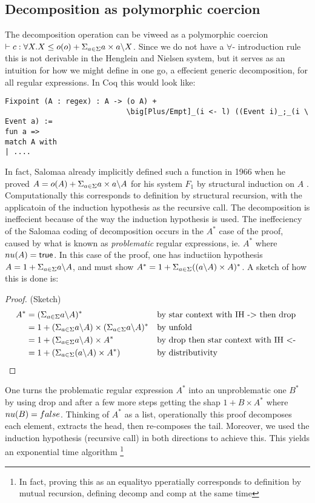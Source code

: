 \documentclass[a4paper,UKenglish,cleveref, autoref, thm-restate]{lipics-v2021}
\newcommand\mycomment[1]{}
\begin{document}
\subsection{Decomposition as polymorphic coercion}
The decomposition operation can be viweed as a polymorphic coercion $\contains{}{c}{\forall X. X}{\myo{o} + \decomp{X}}$. Since we do not have a $\forall$- introduction rule this is not derivable in the Henglein and Nielsen system, but it serves as an intuition for how we might define in one go, a effecient generic decomposition, for all regular expressions. In Coq this would look like:
\begin{verbatim}
Fixpoint (A : regex) : A -> (o A) +  
                            \big[Plus/Empt]_(i <- l) ((Event i)_;_(i \ Event a) :=
fun a => 
match A with 
| ....
\end{verbatim}
In fact, Salomaa already implicitly defined such a function in 1966 when he proved $A = o(A) + \Sigma_{a \in \Sigma} a\times a \backslash A$ for his system $F_1$ by structural induction on $A$ \mycomment{is that the right name of system?}. Computationally this corresponds to definition by structural recursion, with the applicatoin of the induction hypothesis as the recursive call. The decomposition is ineffecient because of the way the  induction hypothesis is used. The ineffeciency of the Salomaa coding of decomposition occurs in the $A^*$ case of the proof, caused by what is known as \textit{problematic} regular expressions, ie. $A^ *$ where $\mynu{A} = \textsf{true}$. In this case of the proof, one has inductiion hypothesis $A = 1 + \Sigma_{a \in \Sigma} a \backslash A$, and must show $A^* = 1  + \Sigma_{a \in \Sigma} ((a \backslash A)\times A)^*$. A sketch of how this is done is:
\begin{proof} (Sketch)
\begin{align}
A^* &= ( \Sigma_{a \in \Sigma} a \backslash A)^* &&\text{by star context with IH -> then drop}\\
 &= 1 + (\Sigma_{a \in \Sigma} a \backslash A) \times (\Sigma_{a \in \Sigma} a \backslash A)^* &&\text{by unfold}\\
 &= 1 + (\Sigma_{a \in \Sigma} a \backslash A) \times A^* && \text{by drop then star context with IH <- } \\
 &= 1 + (\Sigma_{a \in \Sigma} (a \backslash A) \times A^*) && \text{by distributivity }
\end{align}
\end{proof}
One turns the problematic regular expression $A^*$ into an unproblematic one $B^*$ by using drop and after a few more steps getting the shap $1 + B \times A^*$ where $\mynu{B} = \false$. Thinking of $A^*$ as a list, operationally this proof decomposes each element, extracts the head, then re-composes the tail. Moreover, we used the induction hypothesis (recursive call) in both directions to achieve this. This yields an exponential time algorithm \footnote{In fact, proving this as an equalityo pperatially corresponds to definition by mutual recursion, defining \textsf{decomp} and \textsf{comp} at the same time \mycomment{Is this true?}}
\end{document}
